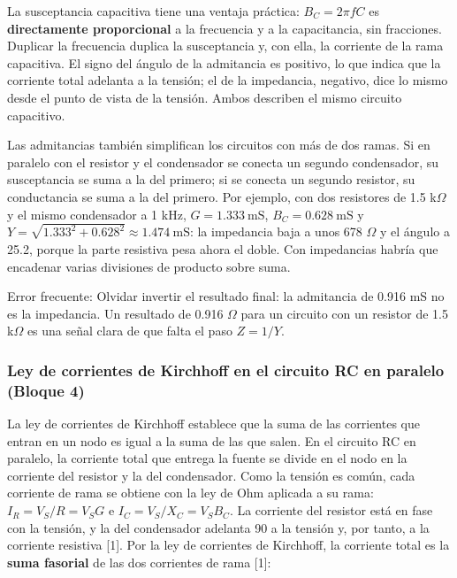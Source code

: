 \documentclass[11pt,letterpaper]{article}
\begin{document}
La susceptancia capacitiva tiene una ventaja práctica: $B_C = 2\pi f C$ es \textbf{directamente proporcional} a la frecuencia y a la capacitancia, sin fracciones. Duplicar la frecuencia duplica la susceptancia y, con ella, la corriente de la rama capacitiva. El signo del ángulo de la admitancia es positivo, lo que indica que la corriente total adelanta a la tensión; el de la impedancia, negativo, dice lo mismo desde el punto de vista de la tensión. Ambos describen el mismo circuito capacitivo.

Las admitancias también simplifican los circuitos con más de dos ramas. Si en paralelo con el resistor y el condensador se conecta un segundo condensador, su susceptancia se suma a la del primero; si se conecta un segundo resistor, su conductancia se suma a la del primero. Por ejemplo, con dos resistores de 1.5 k\ensuremath{\Omega} y el mismo condensador a 1 kHz, $G = 1.333\ \text{mS}$, $B_C = 0.628\ \text{mS}$ y $Y = \sqrt{1.333^2 + 0.628^2} \approx 1.474\ \text{mS}$: la impedancia baja a unos 678 \ensuremath{\Omega} y el ángulo a 25.2\textdegree{}, porque la parte resistiva pesa ahora el doble. Con impedancias habría que encadenar varias divisiones de producto sobre suma.

\begin{nota}{Error frecuente:}
Olvidar invertir el resultado final: la admitancia de 0.916 mS no es la impedancia. Un resultado de \guillemotleft{}0.916 \ensuremath{\Omega}\guillemotright{} para un circuito con un resistor de 1.5 k\ensuremath{\Omega} es una señal clara de que falta el paso $Z = 1/Y$.
\end{nota}

\subsubsection{Ley de corrientes de Kirchhoff en el circuito RC en paralelo (Bloque 4)}

La ley de corrientes de Kirchhoff establece que la suma de las corrientes que entran en un nodo es igual a la suma de las que salen. En el circuito RC en paralelo, la corriente total que entrega la fuente se divide en el nodo en la corriente del resistor y la del condensador. Como la tensión es común, cada corriente de rama se obtiene con la ley de Ohm aplicada a su rama: $I_R = V_S/R = V_S G$ e $I_C = V_S/X_C = V_S B_C$. La corriente del resistor está en fase con la tensión, y la del condensador adelanta 90\textdegree{} a la tensión y, por tanto, a la corriente resistiva [1]. Por la ley de corrientes de Kirchhoff, la corriente total es la \textbf{suma fasorial} de las dos corrientes de rama [1]:
\end{document}
